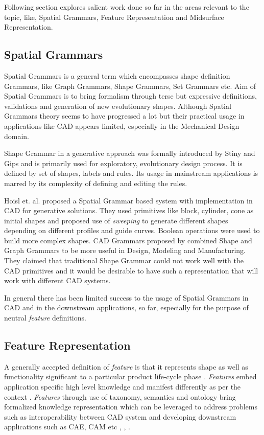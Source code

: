 	Following section explores salient work done so far in the areas relevant to the topic, like, Spatial Grammars, Feature Representation and Midsurface Representation.

\subsection{Spatial Grammars}

Spatial Grammars is a general term which encompasses shape definition Grammars, like Graph Grammars, Shape Grammars, Set Grammars etc. Aim of Spatial Grammars is to bring formalism through terse but expressive definitions, validations and generation of new evolutionary shapes.  Although Spatial Grammars theory seems to have progressed a lot but their practical usage in applications like CAD appears limited, especially in the Mechanical Design domain.

Shape Grammar in a generative approach was formally introduced by Stiny and Gips \cite{Stiny1971} and is primarily used for exploratory, evolutionary design process. It is defined by set of shapes, labels and rules. Its usage in mainstream applications is marred by its complexity of defining and editing the rules.

Hoisl et. al.\cite{Hoisl2009}  proposed a Spatial Grammar based system with implementation in CAD for generative solutions. They used primitives like block, cylinder, cone as initial shapes and proposed use of {\em sweeping} to generate different shapes depending on different profiles and guide curves. Boolean operations were used to build more complex shapes. CAD Grammars proposed by \cite{Deak2006} combined Shape and Graph Grammars to be more useful in Design, Modeling and Manufacturing. They claimed that traditional Shape Grammar could not work well with the CAD primitives and it would be desirable to have such a representation that will work with different CAD systems.

In general there has been limited success to the usage of Spatial Grammars in CAD and in the downstream applications, so far, especially for the purpose of neutral {\em feature} definitions.

\subsection{Feature Representation}

A generally accepted definition of {\em feature} is that  it represents shape as well as functionality significant to a particular product life-cycle phase \cite{Berg2002}. {\em Features} embed application specific high level knowledge and manifest differently as per the context \cite{mandorli1996}. {\em Features} through use of taxonomy, semantics and ontology  bring formalized knowledge representation which can be leveraged to address problems such as interoperability between CAD system and developing downstream applications such as CAE, CAM etc \cite{BidarraBronsvoort2000}, \cite{Tessier2011}, \cite{Ma2013}.

